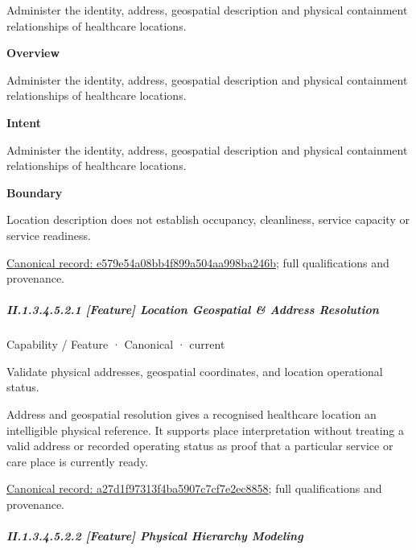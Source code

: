 Administer the identity, address, geospatial description and physical containment relationships of healthcare locations.



\textbf{Overview}



Administer the identity, address, geospatial description and physical containment relationships of healthcare locations.



\textbf{Intent}



Administer the identity, address, geospatial description and physical containment relationships of healthcare locations.



\textbf{Boundary}



Location description does not establish occupancy, cleanliness, service capacity or service readiness.


{\footnotesize \href{../../../../../../../continuum/strategy/capability/e579e54a08bb4f899a504aa998ba246b.md}{Canonical record: e579e54a08bb4f899a504aa998ba246b}; full qualifications and provenance.}\par
\subparagraph*{II.1.3.4.5.2.1 [Feature] Location Geospatial \& Address Resolution}
\label{navigation:II.1.3.4.5.2.1}

\label{element:a27d1f97313f4ba5907c7cf7e2ec8858}
{\small Capability / Feature · Canonical · current}\par

Validate physical addresses, geospatial coordinates, and location operational status.



Address and geospatial resolution gives a recognised healthcare location an intelligible physical reference. It supports place interpretation without treating a valid address or recorded operating status as proof that a particular service or care place is currently ready.


{\footnotesize \href{../../../../../../../continuum/strategy/capability/feature/a27d1f97313f4ba5907c7cf7e2ec8858.md}{Canonical record: a27d1f97313f4ba5907c7cf7e2ec8858}; full qualifications and provenance.}\par
\subparagraph*{II.1.3.4.5.2.2 [Feature] Physical Hierarchy Modeling}
\label{navigation:II.1.3.4.5.2.2}

